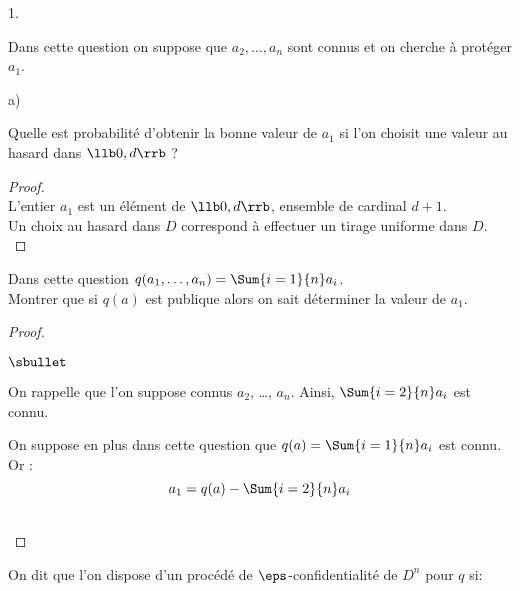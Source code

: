 \documentclass[11pt]{article}%
\begin{document}
\begin{noliste}{1.}
  \setlength{\itemsep}{4mm} %
  \setcounter{enumi}{11}
\item Dans cette question on suppose que $a_2,\ldots,a_n$ sont connus et
  on cherche à protéger $a_1$.
  \begin{noliste}{a)}
  \setlength{\itemsep}{2mm} %
  \item Quelle est probabilité d'obtenir la bonne valeur de $a_1$ si
    l'on choisit une valeur au hasard dans $\llb 0, d \rrb$ ?

    \begin{proof}~\\%
      L'entier $a_1$ est un élément de $\llb 0, d \rrb$, ensemble de
      cardinal $d+1$.\\
      Un choix au hasard dans $D$ correspond à effectuer un tirage
      uniforme dans $D$.%
      ~\\[-1.4cm]
    \end{proof}




  \item Dans cette question $q(a_1,\ldots,a_n) = \Sum{i=1}{n} a_i$.\\
    Montrer que si $q(a)$ est publique alors on sait déterminer la
    valeur de $a_1$.

    \begin{proof}~%
      \begin{noliste}{$\sbullet$}
      \item On rappelle que l'on suppose connus $a_2$, \ldots,
        $a_n$. Ainsi, $\Sum{i=2}{n} a_i$ est connu.

      \item On suppose en plus dans cette question que $q(a) =
        \Sum{i=1}{n} a_i$ est connu. Or :
        \[
        a_1 = q(a) - \Sum{i=2}{n} a_i
        \]        
      \end{noliste}
      ~\\[-1cm]
    \end{proof}
  \end{noliste}
\end{noliste}
On dit que l'on dispose d'un procédé de $\eps$-confidentialité de
$D^n$ pour $q$ si:
\end{document}
